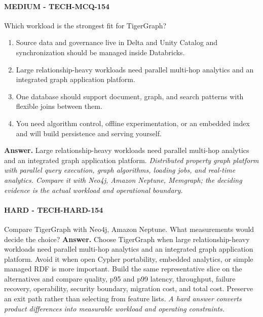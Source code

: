 \paragraph{MEDIUM - TECH-MCQ-154} Which workload is the strongest fit for TigerGraph?
\begin{enumerate}[label=\Alph*.]
\item Source data and governance live in Delta and Unity Catalog and synchronization should be managed inside Databricks.
\item Large relationship-heavy workloads need parallel multi-hop analytics and an integrated graph application platform.
\item One database should support document, graph, and search patterns with flexible joins between them.
\item You need algorithm control, offline experimentation, or an embedded index and will build persistence and serving yourself.
\end{enumerate}
\textbf{Answer.} Large relationship-heavy workloads need parallel multi-hop analytics and an integrated graph application platform.
\textit{Distributed property graph platform with parallel query execution, graph algorithms, loading jobs, and real-time analytics. Compare it with Neo4j, Amazon Neptune, Memgraph; the deciding evidence is the actual workload and operational boundary.}
\paragraph{HARD - TECH-HARD-154} Compare TigerGraph with Neo4j, Amazon Neptune. What measurements would decide the choice?
\textbf{Answer.} Choose TigerGraph when large relationship-heavy workloads need parallel multi-hop analytics and an integrated graph application platform. Avoid it when open Cypher portability, embedded analytics, or simple managed RDF is more important. Build the same representative slice on the alternatives and compare quality, p95 and p99 latency, throughput, failure recovery, operability, security boundary, migration cost, and total cost. Preserve an exit path rather than selecting from feature lists.
\textit{A hard answer converts product differences into measurable workload and operating constraints.}
